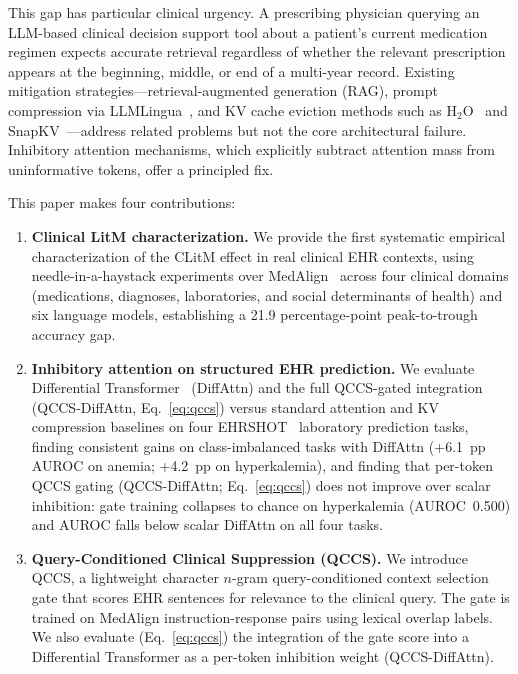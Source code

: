 \documentclass{article}
\begin{document}
This gap has particular clinical urgency. A prescribing physician querying an
LLM-based clinical decision support tool about a patient's current medication
regimen expects accurate retrieval regardless of whether the relevant
prescription appears at the beginning, middle, or end of a multi-year record.
Existing mitigation strategies---retrieval-augmented generation (RAG), prompt
compression via LLMLingua~\cite{pan2024llmlingua2}, and KV cache eviction
methods such as H$_2$O~\cite{zhang2023h2o} and
SnapKV~\cite{li2024snapkv}---address related problems but not the core
architectural failure. Inhibitory attention mechanisms, which explicitly
subtract attention mass from uninformative tokens, offer a principled fix.

This paper makes four contributions:
\begin{enumerate}[leftmargin=*, topsep=2pt, itemsep=1pt]
  \item \textbf{Clinical LitM characterization.} We provide the first
  systematic empirical characterization of the CLitM effect in real clinical
  EHR contexts, using needle-in-a-haystack experiments over
  MedAlign~\cite{fleming2024medalign} across four clinical domains (medications,
  diagnoses, laboratories, and social determinants of health) and six language
  models, establishing a 21.9 percentage-point peak-to-trough accuracy gap.

  \item \textbf{Inhibitory attention on structured EHR prediction.} We evaluate
  Differential Transformer~\cite{ye2025differential} (DiffAttn) and the full
  QCCS-gated integration (QCCS-DiffAttn, Eq.~\ref{eq:qccs}) versus standard attention
  and KV compression baselines on four EHRSHOT~\cite{wornow2023ehrshot}
  laboratory prediction tasks, finding consistent gains on class-imbalanced
  tasks with DiffAttn (+6.1~pp AUROC on anemia; +4.2~pp on hyperkalemia),
  and finding that per-token QCCS gating (QCCS-DiffAttn; Eq.~\ref{eq:qccs}) does
  not improve over scalar inhibition: gate training collapses to chance on
  hyperkalemia (AUROC~0.500) and AUROC falls below scalar DiffAttn on all four tasks.

  \item \textbf{Query-Conditioned Clinical Suppression (QCCS).} We introduce
  QCCS, a lightweight character $n$-gram query-conditioned context selection gate
  that scores EHR sentences for relevance to the clinical query. The gate is
  trained on MedAlign instruction-response pairs using lexical overlap labels.
  We also evaluate (Eq.~\ref{eq:qccs}) the integration of the gate score into
  a Differential Transformer as a per-token inhibition weight (QCCS-DiffAttn).


\end{enumerate}
\end{document}
